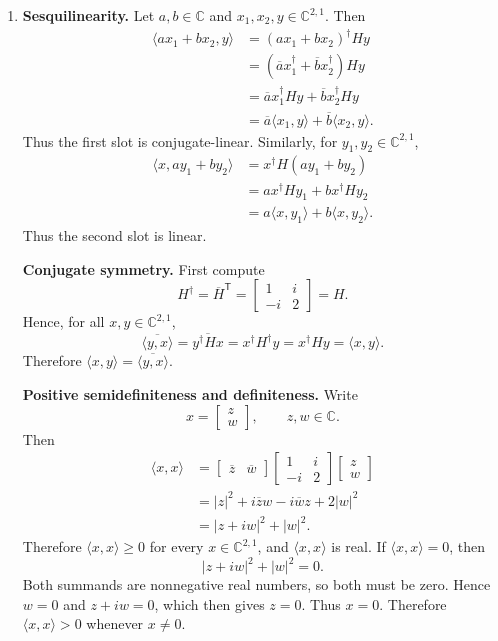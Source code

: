 \documentclass[12pt]{article}
\newcommand{\C}{\mathbb{C}}
\begin{document}
\begin{enumerate}[label=(\alph*)]
\item \textbf{Sesquilinearity.}
Let $a,b\in\C$ and $x_1,x_2,y\in\C^{2,1}$. Then
\begin{align*}
\langle ax_1+bx_2,y\rangle
&=(ax_1+bx_2)^\dagger Hy\\
&=(\overline{a}x_1^\dagger+\overline{b}x_2^\dagger)Hy\\
&=\overline{a}x_1^\dagger Hy+\overline{b}x_2^\dagger Hy\\
&=\overline{a}\langle x_1,y\rangle+\overline{b}\langle x_2,y\rangle.
\end{align*}
Thus the first slot is conjugate-linear. Similarly, for $y_1,y_2\in\C^{2,1}$,
\begin{align*}
\langle x,ay_1+by_2\rangle
&=x^\dagger H(ay_1+by_2)\\
&=a x^\dagger Hy_1+b x^\dagger Hy_2\\
&=a\langle x,y_1\rangle+b\langle x,y_2\rangle.
\end{align*}
Thus the second slot is linear.

\medskip
\noindent\textbf{Conjugate symmetry.}
First compute
\[
H^\dagger=\overline{H}^{\mathsf T}
=
\begin{bmatrix}
1&i\\
-i&2
\end{bmatrix}
=H.
\]
Hence, for all $x,y\in\C^{2,1}$,
\[
\overline{\langle y,x\rangle}
=\overline{y^\dagger Hx}
=x^\dagger H^\dagger y
=x^\dagger Hy
=\langle x,y\rangle.
\]
Therefore $\langle x,y\rangle=\overline{\langle y,x\rangle}$.

\medskip
\noindent\textbf{Positive semidefiniteness and definiteness.}
Write
\[
x=\begin{bmatrix}z\\w\end{bmatrix},\qquad z,w\in\C.
\]
Then
\begin{align*}
\langle x,x\rangle
&=\begin{bmatrix}\overline{z}&\overline{w}\end{bmatrix}
\begin{bmatrix}1&i\\-i&2\end{bmatrix}
\begin{bmatrix}z\\w\end{bmatrix}\\
&=|z|^2+i\overline{z}w-i\overline{w}z+2|w|^2\\
&=|z+iw|^2+|w|^2.
\end{align*}
Therefore $\langle x,x\rangle\ge 0$ for every $x\in\C^{2,1}$, and $\langle x,x\rangle$ is real. If $\langle x,x\rangle=0$, then
\[
|z+iw|^2+|w|^2=0.
\]
Both summands are nonnegative real numbers, so both must be zero. Hence $w=0$ and $z+iw=0$, which then gives $z=0$. Thus $x=0$. Therefore $\langle x,x\rangle>0$ whenever $x\neq 0$.


\end{enumerate}
\end{document}
